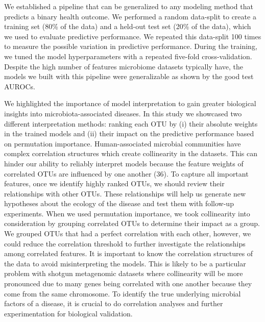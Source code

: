 \documentclass[11pt,]{article}
\begin{document}
We established a pipeline that can be generalized to any modeling method
that predicts a binary health outcome. We performed a random data-split
to create a training set (80\% of the data) and a held-out test set
(20\% of the data), which we used to evaluate predictive performance. We
repeated this data-split 100 times to measure the possible variation in
predictive performance. During the training, we tuned the model
hyperparameters with a repeated five-fold cross-validation. Despite the
high number of features microbiome datasets typically have, the models
we built with this pipeline were generalizable as shown by the good test
AUROCs.

We highlighted the importance of model interpretation to gain greater
biological insights into microbiota-associated diseases. In this study
we showcased two different interpretation methods: ranking each OTU by
(i) their absolute weights in the trained models and (ii) their impact
on the predictive performance based on permutation importance.
Human-associated microbial communities have complex correlation
structures which create collinearity in the datasets. This can hinder
our ability to reliably interpret models because the feature weights of
correlated OTUs are influenced by one another (36). To capture all
important features, once we identify highly ranked OTUs, we should
review their relationships with other OTUs. These relationships will
help us generate new hypotheses about the ecology of the disease and
test them with follow-up experiments. When we used permutation
importance, we took collinearity into consideration by grouping
correlated OTUs to determine their impact as a group. We grouped OTUs
that had a perfect correlation with each other, however, we could reduce
the correlation threshold to further investigate the relationships among
correlated features. It is important to know the correlation structures
of the data to avoid misinterpreting the models. This is likely to be a
particular problem with shotgun metagenomic datasets where collinearity
will be more pronounced due to many genes being correlated with one
another because they come from the same chromosome. To identify the true
underlying microbial factors of a disease, it is crucial to do
correlation analyses and further experimentation for biological
validation.
\end{document}
